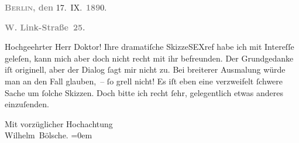 \pstart
           \raggedleft{}\textcolor{gray}{\textbf{\textsc{Berlin}, den}}{ }17. IX. \textcolor{gray}{\textbf{189}}0.\pend
           
\pstart
           \raggedleft{}\textcolor{gray}{\textbf{W. Link-Straße 25.}}\pend
           
\pstart\center{}Hochgeehrter Herr Doktor!\pend\vspace{0.5em}
\pstart
           Ihre dramatiſche SkizzeSEXref habe
               ich mit Intereſſe geleſen, kann mich aber doch nicht recht mit ihr befreunden. Der
               Grundgedanke iſt originell, aber der Dialog{ }ſagt mir nicht zu. Bei breiterer
               Ausmalung würde man an den Fall glauben, –{ }ſo grell nicht! Es iſt eben eine
               verzweifelt{ }ſchwere Sache um{ }ſolche Skizzen. Doch bitte ich recht{ }ſehr, gelegentlich
               etwas anderes einzuſenden.\pend
           
\pstart
           Mit vorzüglicher Hochachtung{\\[\baselineskip]}\spacefill\mbox{Wilhelm Bölsche.}\pend
           \leftskip=0em{}\endnumbering{}  
      
